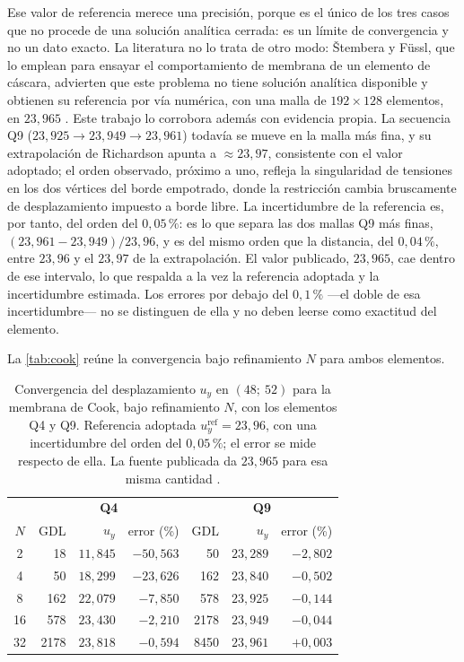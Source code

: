 Ese valor de referencia merece una precisión, porque es el único de los tres casos que no procede de una solución analítica cerrada: es un límite de convergencia y no un dato exacto. La literatura no lo trata de otro modo: Štembera y Füssl, que lo emplean para ensayar el comportamiento de membrana de un elemento de cáscara, advierten que este problema no tiene solución analítica disponible y obtienen su referencia por vía numérica, con una malla de $192\times128$ elementos, en $23{,}965$ \autocite[p.~28]{stembera2019dkmq24}. Este trabajo lo corrobora además con evidencia propia. La secuencia Q9 ($23{,}925 \to 23{,}949 \to 23{,}961$) todavía se mueve en la malla más fina, y su extrapolación de Richardson \autocite[pp.~309-312]{oberkampf2010vv} apunta a $\approx 23{,}97$, consistente con el valor adoptado; el orden observado, próximo a uno, refleja la singularidad de tensiones en los dos vértices del borde empotrado, donde la restricción cambia bruscamente de desplazamiento impuesto a borde libre. La incertidumbre de la referencia es, por tanto, del orden del $0{,}05\,\%$: es lo que separa las dos mallas Q9 más finas, $(23{,}961-23{,}949)/23{,}96$, y es del mismo orden que la distancia, del $0{,}04\,\%$, entre $23{,}96$ y el $23{,}97$ de la extrapolación. El valor publicado, $23{,}965$, cae dentro de ese intervalo, lo que respalda a la vez la referencia adoptada y la incertidumbre estimada. Los errores por debajo del $0{,}1\,\%$ ---el doble de esa incertidumbre--- no se distinguen de ella y no deben leerse como exactitud del elemento.

La \autoref{tab:cook} reúne la convergencia bajo refinamiento $N$ para ambos elementos.

\begin{table}[htbp]
\centering
\caption[Convergencia del desplazamiento $u_y$ en $(48;\ 52)$ para la membrana de Cook.]{Convergencia del desplazamiento $u_y$ en $(48;\ 52)$ para la membrana de Cook, bajo refinamiento $N$, con los elementos Q4 y Q9. Referencia adoptada $u_y^{\mathrm{ref}} = 23{,}96$, con una incertidumbre del orden del $0{,}05\,\%$; el error se mide respecto de ella. La fuente publicada da $23{,}965$ para esa misma cantidad \autocite[p.~28]{stembera2019dkmq24}.}
\label{tab:cook}
\begin{tabular}{c r r r r r r}
\hline
 & \multicolumn{3}{c}{\textbf{Q4}} & \multicolumn{3}{c}{\textbf{Q9}} \\
$N$ & GDL & $u_y$ & error (\%) & GDL & $u_y$ & error (\%) \\
\hline
2  & 18   & $11{,}845$ & $-50{,}563$ & 50   & $23{,}289$ & $-2{,}802$ \\
4  & 50   & $18{,}299$ & $-23{,}626$ & 162  & $23{,}840$ & $-0{,}502$ \\
8  & 162  & $22{,}079$ & $-7{,}850$  & 578  & $23{,}925$ & $-0{,}144$ \\
16 & 578  & $23{,}430$ & $-2{,}210$  & 2178 & $23{,}949$ & $-0{,}044$ \\
32 & 2178 & $23{,}818$ & $-0{,}594$  & 8450 & $23{,}961$ & $+0{,}003$ \\
\hline
\end{tabular}
\end{table}

